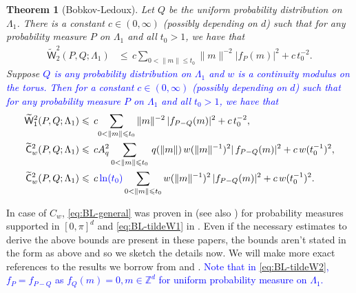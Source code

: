 \documentclass[12pt]{article}
\newtheorem{theorem}{Theorem}
\newcommand{\Z}{\mathbb{Z}}
\newcommand{\1}{\mathbf{1}}
\newcommand{\dy}[1]{\textcolor{blue}{#1}}
\newcommand{\dy}[1]{#1}%
\begin{document}
{{{{\begin{theorem}[Bobkov-Ledoux]
\label{thm:BL}
      \label{thm:bd-finite-sample}Let $Q$ be the uniform {probability distribution} on $\Lambda _{1}$. {There is a constant $c \in (0,\infty)$ (possibly depending on $d$)} such that for any probability measure $P$ on $\Lambda _{1}$ and all ${t_0} > 1$, we have that %
\begin{align}
\label{eq:BL-tildeW2}
  \widetilde{\mathsf W}_{2}^{2}(P ,Q ; \Lambda_1)& \leqslant  \,c {\sum_{0< \| m \| \leqslant t_0}\|m\|^{-2}| f_{P}(m) | ^{2}}+c \, t_0^{-2}.
\end{align}
%
Suppose \dy{$Q$ is any probability distribution on $\Lambda_1$ and $w$ is a continuity modulus on the torus. %
 Then {for a constant $c \in (0,\infty)$ (possibly depending on $d$)} such that for any probability measure $P$ on $\Lambda _{1}$ and all ${t_0} > 1$, we have that}
{
%
     \begin{align}
     \label{eq:BL-tildeW1}  \widetilde{\mathsf W}_{1}^{2}(P ,Q ; \Lambda_1) & \leqslant  \,c {\sum_{0< \|m\| \leqslant t_0}\|m\|^{-2} \, | f_{P-Q}(m) | ^{2}}+c \, t_0^{-2},\\
\label{eq:BL-general}
 \widetilde{\mathsf C}^{2}_{w}(P ,Q ; \Lambda_1) & \leqslant  \, c{A_q^2} \,  {\sum_{0< \|m \| \leqslant t_0} \, {q(\|m\|)} \, w(\|m\|^{-1})^{2}| \, f_{P -Q }(m) | ^{2}}+c \, w(t_0^{-1})^{2}, \\
 \label{eq:BL-general1}
 \widetilde{\mathsf C}^{2}_{w}(P ,Q ; \Lambda_1) & \leqslant  \, c \, \dy{ \ln(t_0)} \,  {\sum_{0< \|m \| \leqslant t_0} w(\|m\|^{-1})^{2} \, | f_{P -Q }(m) | ^{2}}+c \, w(t_0^{-1})^{2}.
 \end{align}
%
}
\end{theorem}
%
{In case of $C_w$, \eqref{eq:BL-general} was proven in \cite[Proposition 7.1]{bobkov2020transport} (see also \cite{bobkov2024correction}) for probability measures supported in $[0,\pi]^d$ and \eqref{eq:BL-tildeW1} in \cite[Proposition 2]{bobkov2021simple}. Even if the necessary estimates to derive the above bounds are present in these papers, the bounds aren't stated in the form as above and so we sketch the details now. We will make more exact references to the results we borrow from \cite{bobkov2020transport} and \cite{bobkov2021simple}. \dy{Note that in \eqref{eq:BL-tildeW2}, $f_{P} = f_{P-Q}$ as $f_Q(m) = 0, m \in \Z^d$ for uniform probability measure on $\Lambda_1$.}

}}}}}
\end{document}
